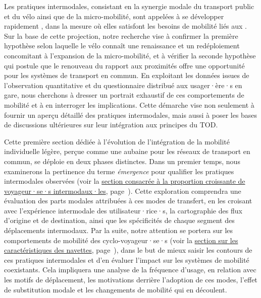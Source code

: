 \begin{refsegment}
Les pratiques intermodales, consistant en la synergie modale du transport public et du vélo ainsi que de la micro-mobilité, sont appelées à se développer rapidement \textcolor{blue}{\autocite[4]{kostrzewska_towards_2017}}, dans la mesure où elles satisfont les besoins de mobilité liés aux  \textcolor{blue}{\autocite[29]{holm_moller_micromobility_2020}}. Sur la base de cette projection, notre recherche vise à confirmer la première hypothèse selon laquelle le vélo connaît une renaissance et un redéploiement concomitant à l'expansion de la micro-mobilité, et à vérifier la seconde hypothèse qui postule que le renouveau du rapport aux proximités offre une opportunité pour les systèmes de transport en commun. En exploitant les données issues de l'observation quantitative et du questionnaire distribué aux usager·ère·s en gare, nous cherchons à dresser un portrait exhaustif de ces comportements de mobilité et à en interroger les implications. Cette démarche vise non seulement à fournir un aperçu détaillé des pratiques intermodales, mais aussi à poser les bases de discussions ultérieures sur leur intégration aux principes du \acrfull{TOD}.%

Cette première section dédiée à l'évolution de l'intégration de la mobilité individuelle légère, perçue comme une aubaine pour les réseaux de transport en commun, se déploie en deux phases distinctes. Dans un premier temps, nous examinerons la pertinence du terme \textsl{émergence} pour qualifier les pratiques intermodales observées (voir la \hyperref[chap4:proportion-croissante-voyageurs-intermodaux]{section consacrée à la proportion croissante de voyageur·se·s intermodaux·les}, page~\pageref{chap4:proportion-croissante-voyageurs-intermodaux}). Cette exploration comprendra une évaluation des parts modales attribuées à ces modes de transfert, en les croisant avec l'expérience intermodale des utilisateur·rice·s, la \gls{cartographie} des flux d'origine et de destination, ainsi que les spécificités de chaque segment des déplacements intermodaux. Par la suite, notre attention se portera sur les comportements de mobilité des cyclo-voyageur·se·s (voir la \hyperref[chap4:comportements-mobilite]{section sur les caractéristiques des navettes}, page~\pageref{chap4:comportements-mobilite}), dans le but de mieux saisir les contours de ces pratiques intermodales et d'en évaluer l'impact sur les systèmes de mobilité coexistants. Cela impliquera une analyse de la fréquence d'usage, en relation avec les motifs de \gls{déplacement}, les motivations derrière l'adoption de ces modes, l'effet de substitution modale et les changements de mobilité qui en découlent.%


\end{refsegment}
